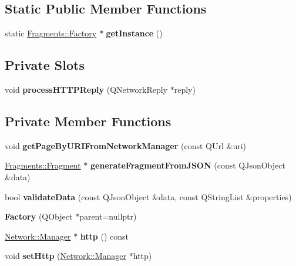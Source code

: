 \subsection*{Static Public Member Functions}
\begin{DoxyCompactItemize}
\item 
\mbox{\label{classFragments_1_1Factory_aa88217eb8d93cfefc22a1c35201a4f3d}} 
static \mbox{\hyperlink{classFragments_1_1Factory}{Fragments\+::\+Factory}} $\ast$ {\bfseries get\+Instance} ()
\end{DoxyCompactItemize}
\subsection*{Private Slots}
\begin{DoxyCompactItemize}
\item 
\mbox{\label{classFragments_1_1Factory_a0ee4ef4c4521a4bce9fe901236a14c84}} 
void {\bfseries process\+H\+T\+T\+P\+Reply} (Q\+Network\+Reply $\ast$reply)
\end{DoxyCompactItemize}
\subsection*{Private Member Functions}
\begin{DoxyCompactItemize}
\item 
\mbox{\label{classFragments_1_1Factory_a9a5923caf97c4e8dba24e23539328deb}} 
void {\bfseries get\+Page\+By\+U\+R\+I\+From\+Network\+Manager} (const Q\+Url \&uri)
\item 
\mbox{\label{classFragments_1_1Factory_a1a4089fcba571e00af535ab6226acc16}} 
\mbox{\hyperlink{classFragments_1_1Fragment}{Fragments\+::\+Fragment}} $\ast$ {\bfseries generate\+Fragment\+From\+J\+S\+ON} (const Q\+Json\+Object \&data)
\item 
\mbox{\label{classFragments_1_1Factory_a62a60fd81fec95b794a8b27188b51824}} 
bool {\bfseries validate\+Data} (const Q\+Json\+Object \&data, const Q\+String\+List \&properties)
\item 
\mbox{\label{classFragments_1_1Factory_ab7d32596f7330529ea2cdb339b6c3317}} 
{\bfseries Factory} (Q\+Object $\ast$parent=nullptr)
\item 
\mbox{\label{classFragments_1_1Factory_ae9f54ac342a7fd5010689d80ef343424}} 
\mbox{\hyperlink{classNetwork_1_1Manager}{Network\+::\+Manager}} $\ast$ {\bfseries http} () const
\item 
\mbox{\label{classFragments_1_1Factory_ae5738a3e881b1791dda120e34be3cea9}} 
void {\bfseries set\+Http} (\mbox{\hyperlink{classNetwork_1_1Manager}{Network\+::\+Manager}} $\ast$http)
\end{DoxyCompactItemize}

